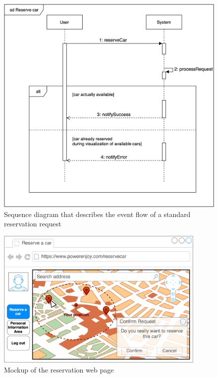 \begin{figure}[H]
\begin{center}
		\includegraphics[width=\textwidth]{./specific_requirements/features/diagrams/reserve_car_sd.png}
		\caption{Sequence diagram that describes the event flow of a standard reservation request}
		\label{reserve_car_sd}
\end{center}
\end{figure}

\begin{figure}[H]
\begin{center}
		\includegraphics[width=0.9\textwidth]{./specific_requirements/features/diagrams/web_reserve_car.png}
		\caption{Mockup of the reservation web page}
		\label{web_reserve_car}
\end{center}
\end{figure}

